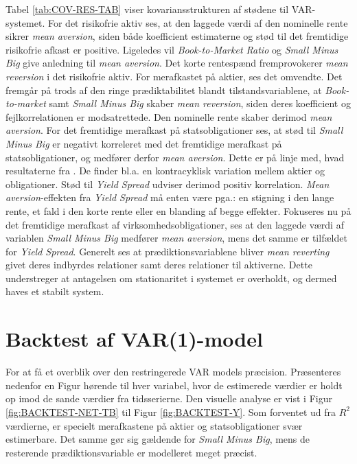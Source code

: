 \documentclass[
  a4paper,
  oneside]{memoir}
\begin{document}
Tabel \ref{tab:COV-RES-TAB} viser kovariansstrukturen af stødene til VAR-systemet. For det risikofrie aktiv ses, at den laggede værdi af den nominelle rente sikrer \emph{mean aversion}, siden både koefficient estimaterne og stød til det fremtidige risikofrie afkast er positive. Ligeledes vil \emph{Book-to-Market Ratio} og \emph{Small Minus Big} give anledning til \emph{mean aversion}. Det korte rentespænd fremprovokerer \emph{mean reversion} i det risikofrie aktiv. For merafkastet på aktier, ses det omvendte. Det fremgår på trods af den ringe prædiktabilitet blandt tilstandsvariablene, at \emph{Book-to-market} samt \emph{Small Minus Big} skaber \emph{mean reversion}, siden deres koefficient og fejlkorrelationen er modsatrettede. Den nominelle rente skaber derimod \emph{mean aversion}. For det fremtidige merafkast på statsobligationer ses, at stød til \emph{Small Minus Big} er negativt korreleret med det fremtidige merafkast på statsobligationer, og medfører derfor \emph{mean aversion}. Dette er på linje med, hvad resultaterne fra \citep{Fama1989}. De finder bl.a. en kontracyklisk variation mellem aktier og obligationer. Stød til \emph{Yield Spread} udviser derimod positiv korrelation. \emph{Mean aversion}-effekten fra \emph{Yield Spread} må enten være pga.: en stigning i den lange rente, et fald i den korte rente eller en blanding af begge effekter. Fokuseres nu på det fremtidige merafkast af virksomhedsobligationer, ses at den laggede værdi af variablen \emph{Small Minus Big} medfører \emph{mean aversion}, mens det samme er tilfældet for \emph{Yield Spread}. Generelt ses at prædiktionsvariablene bliver \emph{mean reverting} givet deres indbyrdes relationer samt deres relationer til aktiverne. Dette understreger at antagelsen om stationaritet i systemet er overholdt, og dermed haves et stabilt system.

\hypertarget{backtestvar}{%
\section{Backtest af VAR(1)-model}\label{backtestvar}}

For at få et overblik over den restringerede VAR models præcision. Præsenteres nedenfor en Figur hørende til hver variabel, hvor de estimerede værdier er holdt op imod de sande værdier fra tidsserierne. Den visuelle analyse er vist i Figur \ref{fig:BACKTEST-NET-TB} til Figur \ref{fig:BACKTEST-Y}. Som forventet ud fra \(R^2\) værdierne, er specielt merafkastene på aktier og statsobligationer svær estimerbare. Det samme gør sig gældende for \emph{Small Minus Big}, mens de resterende prædiktionsvariable er modelleret meget præcist.
\end{document}
